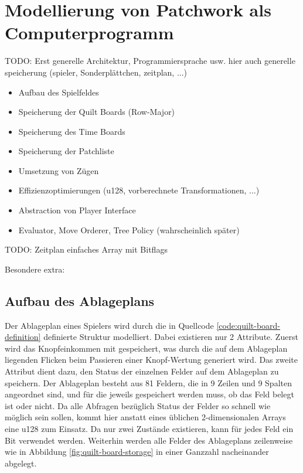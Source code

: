 \chapter{Modellierung von Patchwork als Computerprogramm}
\label{chapter:modellierung-von-patchwork-als-computerprogramm}

TODO: Erst generelle Architektur, Programmiersprache usw. hier auch generelle speicherung (spieler, Sonderplättchen, zeitplan, ...)

\begin{itemize}
    \item Aufbau des Spielfeldes
    \item Speicherung der Quilt Boards (Row-Major)
    \item Speicherung des Time Boards
    \item Speicherung der Patchliste
    \item Umsetzung von Zügen
    \item Effizienzoptimierungen (u128, vorberechnete Transformationen, ...)
    \item Abstraction von Player Interface
    \item Evaluator, Move Orderer, Tree Policy (wahrscheinlich später)
\end{itemize}

TODO: Zeitplan einfaches Array mit Bitflags

Besondere extra:

\section{Aufbau des Ablageplans}



Der Ablageplan eines Spielers wird durch die in Quellcode \ref{code:quilt-board-definition} definierte Struktur  modelliert. Dabei existieren nur 2 Attribute. Zuerst wird das Knopfeinkommen mit  gespeichert, was durch die auf dem Ablageplan liegenden Flicken beim Passieren einer Knopf-Wertung generiert wird. Das zweite Attribut  dient dazu, den Status der einzelnen Felder auf dem Ablageplan zu speichern. Der Ablageplan besteht aus 81 Feldern, die in 9 Zeilen und 9 Spalten angeordnet sind, und für die jeweils gespeichert werden muss, ob das Feld belegt ist oder nicht. Da alle Abfragen bezüglich Status der Felder so schnell wie möglich sein sollen, kommt hier anstatt eines üblichen 2-dimensionalen Arrays eine \ac{u128} zum Einsatz. Da nur zwei Zustände existieren, kann für jedes Feld ein Bit verwendet werden. Weiterhin werden alle Felder des Ablageplans zeilenweise wie in Abbildung \ref{fig:quilt-board-storage} in einer Ganzzahl nacheinander abgelegt.

